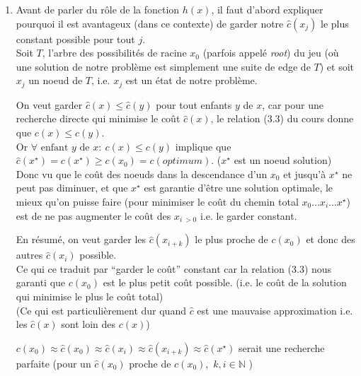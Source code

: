 \documentclass[french]{article}
\newcommand{\quo}[1]{``{#1}''}
\newcommand{\N}{\mathbb{N}}
\newcommand{\xsol}{x^{\star}}
\begin{document}
\begin{enumerate}[label=(\alph*)]

	\item Avant de parler du rôle de la fonction $h(x)$, il faut d'abord expliquer pourquoi il est avantageux (dans ce contexte) de garder notre $\hat{c}(x_j)$ le plus constant possible pour tout $j$.\\
	
	Soit $T$, l'arbre des possibilités de racine $x_0$ (parfois appelé \textit{root}) du jeu (où une solution de notre problème est simplement une suite de edge de $T$)
	et soit $x_j$ un noeud de $T$, i.e. $x_j$ est un état de notre problème.
	
	On veut garder $\hat{c}(x) \leq \hat{c}(y)$ pour tout enfants $y$ de $x$, car pour une recherche directe 
	qui minimise le coût $\hat{c}(x)$, le relation (3.3) du cours donne que $c(x) \leq c(y)$. \\
	
	Or $\forall \text{ enfant } y \text{ de } x:\ c(x) \leq c(y)$ 
	implique que $\hat{c}(\xsol) = c(\xsol) \ge c(x_0) = c(\textit{optimum})$. ($\xsol$ est un noeud solution) \\
	Donc vu que le coût des noeuds dans la descendance d'un $x_0$ et jusqu'à \(\xsol\) ne peut pas diminuer, et que $\xsol$ 
	est garantie d'être une solution optimale, le mieux qu'on puisse faire (pour minimiser le coût du chemin total $x_0 \ldots x_i\ldots \xsol$) est de ne pas augmenter
	le coût des $x_{i\ >0}$ i.e. le garder constant.

	En résumé, on veut garder les $\hat{c}(x_{i+k})$ le plus proche de $c(x_0)$ et donc des autres $\hat{c}(x_i)$ possible.\\
	Ce qui ce traduit par \quo{garder le coût} constant car la relation (3.3) nous garanti que $c(x_0)$ est le plus petit coût possible. (i.e. le coût de la solution qui minimise le plus le coût total)\\
	(Ce qui est particulièrement dur quand $\hat{c}$ est une mauvaise approximation i.e. les $\hat{c}(x)$ sont loin des $c(x)$)

 $c(x_0) \approx \hat{c}(x_0) \approx \hat{c}(x_i) \approx \hat{c}(x_{i+k}) \approx \hat{c}(\xsol)$ serait une recherche parfaite
 (pour un $\hat{c}(x_0)$ proche de $c(x_0)$,\ \(k, i \in \N\) )\\


\end{enumerate}
\end{document}
